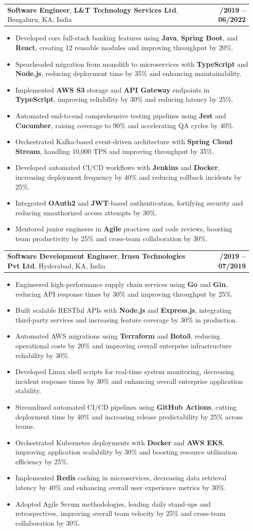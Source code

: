 \documentclass[letterpaper,11pt]{article}
\makeatletter
\newcommand{\resumeItem}[1]{
  \item\footnotesize{
    {#1 \vspace{-2pt}}
  }
}
\newcommand{\resumeSubheading}[4]{
  \vspace{-2pt}\item
    \begin{tabular*}{1.0\textwidth}[t]{l@{\extracolsep{\fill}}r}
      \textbf{\fontsize{10pt}{14pt}\selectfont #3}, \textbf{\fontsize{10pt}{14pt}\selectfont #1}, \fontsize{10pt}{14pt}\selectfont #4 & \textbf{\fontsize{10pt}{14pt}\selectfont #2} \\
    \end{tabular*}\vspace{-7pt}
}
\newcommand{\resumeItemListStart}{\begin{itemize}[leftmargin=*]}
\newcommand{\resumeItemListEnd}{\end{itemize}\vspace{-5pt}}
\makeatother
\begin{document}
    \resumeSubheading
        {L\&T Technology Services Ltd}{08/2019 -- 06/2022}
        {Software Engineer}{Bengaluru, KA, India}
      \resumeItemListStart
        \resumeItem{Developed core full-stack banking features using \textbf{Java}, \textbf{Spring Boot}, and \textbf{React}, creating 12 reusable modules and improving throughput by 20\%.}
        \resumeItem{Spearheaded migration from monolith to microservices with \textbf{TypeScript} and \textbf{Node.js}, reducing deployment time by 35\% and enhancing maintainability.}
        \resumeItem{Implemented \textbf{AWS S3} storage and \textbf{API Gateway} endpoints in \textbf{TypeScript}, improving reliability by 30\% and reducing latency by 25\%.}
        \resumeItem{Automated end-to-end comprehensive testing pipelines using \textbf{Jest} and \textbf{Cucumber}, raising coverage to 90\% and accelerating QA cycles by 40\%.}
        \resumeItem{Orchestrated Kafka-based event-driven architecture with \textbf{Spring Cloud Stream}, handling 10,000 TPS and improving throughput by 35\%.}
        \resumeItem{Developed automated CI/CD workflows with \textbf{Jenkins} and \textbf{Docker}, increasing deployment frequency by 40\% and reducing rollback incidents by 25\%.}
        \resumeItem{Integrated \textbf{OAuth2} and \textbf{JWT}-based authentication, fortifying security and reducing unauthorized access attempts by 30\%.}
        \resumeItem{Mentored junior engineers in \textbf{Agile} practices and code reviews, boosting team productivity by 25\% and cross-team collaboration by 30\%.}
      \resumeItemListEnd

    \resumeSubheading
        {Irusu Technologies Pvt Ltd}{01/2019 -- 07/2019}
        {Software Development Engineer}{Hyderabad, KA, India}
      \resumeItemListStart
        \resumeItem{Engineered high-performance supply chain services using \textbf{Go} and \textbf{Gin}, reducing API response times by 30\% and improving throughput by 25\%.}
        \resumeItem{Built scalable RESTful APIs with \textbf{Node.js} and \textbf{Express.js}, integrating third-party services and increasing feature coverage by 30\% in production.}
        \resumeItem{Automated AWS migrations using \textbf{Terraform} and \textbf{Boto3}, reducing operational costs by 20\% and improving overall enterprise infrastructure reliability by 30\%.}
        \resumeItem{Developed Linux shell scripts for real-time system monitoring, decreasing incident response times by 30\% and enhancing overall enterprise application stability.}
        \resumeItem{Streamlined automated CI/CD pipelines using \textbf{GitHub Actions}, cutting deployment time by 40\% and increasing release predictability by 25\% across teams.}
        \resumeItem{Orchestrated Kubernetes deployments with \textbf{Docker} and \textbf{AWS EKS}, improving application scalability by 30\% and boosting resource utilization efficiency by 25\%.}
        \resumeItem{Implemented \textbf{Redis} caching in microservices, decreasing data retrieval latency by 40\% and enhancing overall user experience metrics by 30\%.}
        \resumeItem{Adopted Agile Scrum methodologies, leading daily stand-ups and retrospectives, improving overall team velocity by 25\% and cross-team collaboration by 30\%.}
      \resumeItemListEnd
\end{document}
